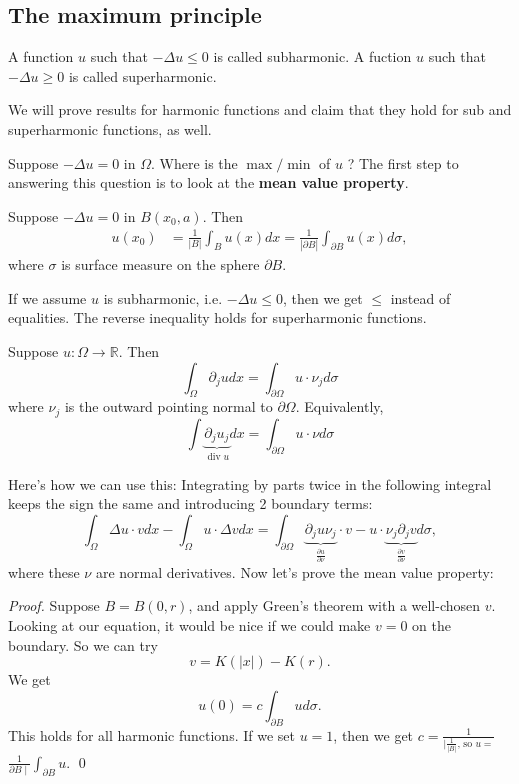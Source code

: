 \subsection{The maximum principle}

\begin{definition}
A function $u$ such that $-\Delta u \le 0$ is called subharmonic. A fuction $u$ such that $-\Delta u\ge 0$ is called superharmonic.
\end{definition}
We will prove results for harmonic functions and claim that they hold for sub and superharmonic functions, as well.

Suppose $-\Delta u=0$ in $\Omega$. Where is the $\max / \min$ of $u$ ? The first step to answering this question is to look at the \textbf{mean value property}.

\begin{theorem}
Suppose $-\Delta u = 0$ in $B(x_0,a)$. Then
\[
    \begin{aligned}
        u\left(x_{0}\right) &=\frac{1}{|B|} \int_{B} u(x) d x =\frac{1}{|\partial B|} \int_{\partial B} u(x) d \sigma,
        \end{aligned}
\]
where $\sigma$ is surface measure on the sphere $\partial B$.
\end{theorem}

\begin{remark}
    If we assume $u$ is subharmonic, i.e. $-\Delta u\le 0$, then we get $\le$ instead of equalities. The reverse inequality holds for superharmonic functions.
\end{remark}

\begin{lemma}
     Suppose $u: \Omega \rightarrow \mathbb{R} .$ Then
$$
\int_{\Omega} \partial_{j} u d x=\int_{\partial \Omega} u \cdot \nu_{j} d \sigma
$$
where $\nu_{j}$ is the outward pointing normal to $\partial \Omega .$ Equivalently,
$$
\int \underbrace{\partial_{j} u_{j}}_{\operatorname{div} u} d x=\int_{\partial \Omega} u \cdot \nu d \sigma
$$
\end{lemma}
Here's how we can use this: Integrating by parts twice in the following integral keeps the sign the same and introducing 2 boundary terms:
\[
    \int_\Omega \Delta u \cdot v d x-\int_{\Omega} u \cdot \Delta v d x=\int_{\partial \Omega} \underbrace{\partial_{j} u \nu_{j}}_{\frac{\partial u}{\partial \nu}} \cdot v-u \cdot \underbrace{\nu_{j} \partial_{j} v}_{\frac{\partial v}{\partial \nu}} d \sigma,
\]
where these $\nu$ are normal derivatives. Now let's prove the mean value property:
\vspace{1em}
\begin{proof}
     Suppose $B=B(0, r)$, and apply Green's theorem with a well-chosen $v$. Looking at our equation, it would be nice if we could make $v=0$ on the boundary. So we can try
$$
v=K(|x|)-K(r).
$$
We get
$$
u(0)=c \int_{\partial B} u d \sigma .
$$
This holds for all harmonic functions. If we set $u=1$, then we get $c=\frac{1}{\mid \frac{1}{|B|} \text {, so } u=}$ $\frac{1}{\partial B \mid} \int_{\partial B} u$.
\qed
\end{proof}

